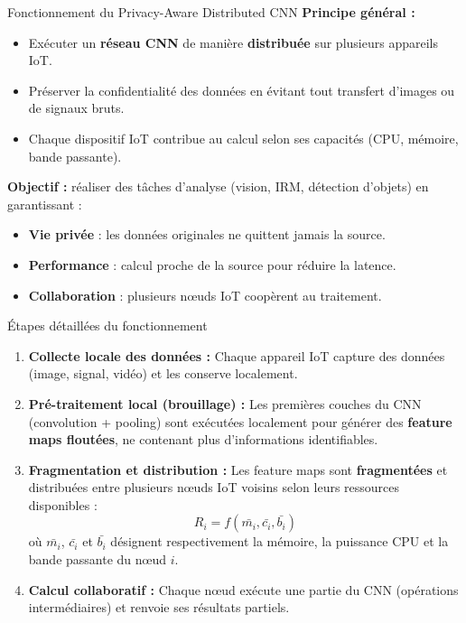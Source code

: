 \documentclass{beamer}
\begin{document}
\begin{frame}{Fonctionnement du Privacy-Aware Distributed CNN}
\textbf{Principe général :}
\begin{itemize}
    \item Exécuter un \textbf{réseau CNN} de manière \textbf{distribuée} sur plusieurs appareils IoT.
    \item Préserver la confidentialité des données en évitant tout transfert d’images ou de signaux bruts.
    \item Chaque dispositif IoT contribue au calcul selon ses capacités (CPU, mémoire, bande passante).
\end{itemize}

\vspace{0.4cm}
\textbf{Objectif :} réaliser des tâches d’analyse (vision, IRM, détection d’objets) en garantissant :
\begin{itemize}
    \item  \textbf{Vie privée} : les données originales ne quittent jamais la source.
    \item  \textbf{Performance} : calcul proche de la source pour réduire la latence.
    \item  \textbf{Collaboration} : plusieurs nœuds IoT coopèrent au traitement.
\end{itemize}
\end{frame}

\begin{frame}{Étapes détaillées du fonctionnement}
\begin{enumerate}
    \item \textbf{Collecte locale des données :}  
    Chaque appareil IoT capture des données (image, signal, vidéo) et les conserve localement.

    \item \textbf{Pré-traitement local (brouillage) :}  
    Les premières couches du CNN (convolution + pooling) sont exécutées localement pour générer des \textbf{feature maps floutées}, ne contenant plus d’informations identifiables.

    \item \textbf{Fragmentation et distribution :}  
    Les feature maps sont \textbf{fragmentées} et distribuées entre plusieurs nœuds IoT voisins selon leurs ressources disponibles :
    \[
    R_i = f(\bar{m_i}, \bar{c_i}, \bar{b_i})
    \]
    où $\bar{m_i}$, $\bar{c_i}$ et $\bar{b_i}$ désignent respectivement la mémoire, la puissance CPU et la bande passante du nœud $i$.

    \item \textbf{Calcul collaboratif :}  
    Chaque nœud exécute une partie du CNN (opérations intermédiaires) et renvoie ses résultats partiels.
\end{enumerate}
\end{frame}
\end{document}
